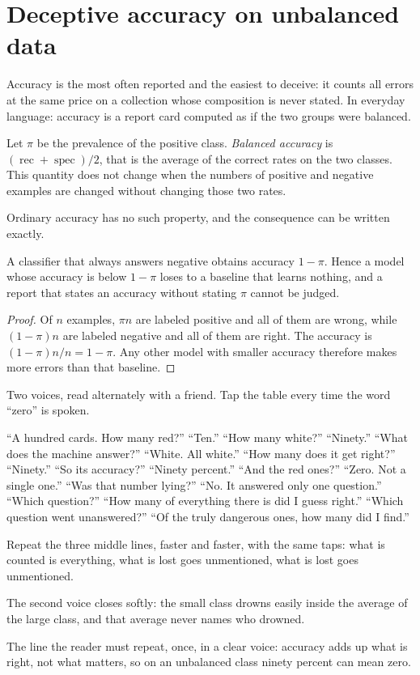 \section{Deceptive accuracy on unbalanced data}

Accuracy is the most often reported and the easiest to deceive: it counts all errors at the same
price on a collection whose composition is never stated. In everyday language: accuracy is a report
card computed as if the two groups were balanced.

\begin{definisi}
Let $\pi$ be the prevalence of the positive class. \emph{Balanced accuracy} is
$(\operatorname{rec}+\operatorname{spec})/2$, that is the average of the correct rates on the two
classes. This quantity does not change when the numbers of positive and negative examples are
changed without changing those two rates.
\end{definisi}

Ordinary accuracy has no such property, and the consequence can be written exactly.

\begin{proposisi}
A classifier that always answers negative obtains accuracy $1-\pi$. Hence a model whose accuracy
is below $1-\pi$ loses to a baseline that learns nothing, and a report that states an accuracy
without stating $\pi$ cannot be judged.
\end{proposisi}

\begin{proof}[Proof]
Of $n$ examples, $\pi n$ are labeled positive and all of them are wrong, while $(1-\pi)n$ are
labeled negative and all of them are right. The accuracy is $(1-\pi)n/n=1-\pi$. Any other model
with smaller accuracy therefore makes more errors than that baseline.
\end{proof}

\begin{bacakeras}
Two voices, read alternately with a friend. Tap the table every time the word ``zero'' is spoken.

``A hundred cards. How many red?'' ``Ten.'' ``How many white?'' ``Ninety.'' ``What does the machine
answer?'' ``White. All white.'' ``How many does it get right?'' ``Ninety.'' ``So its accuracy?''
``Ninety percent.'' ``And the red ones?'' ``Zero. Not a single one.'' ``Was that number lying?''
``No. It answered only one question.'' ``Which question?'' ``How many of everything there is did I
guess right.'' ``Which question went unanswered?'' ``Of the truly dangerous ones, how many did I
find.''

Repeat the three middle lines, faster and faster, with the same taps: what is counted is
everything, what is lost goes unmentioned, what is lost goes unmentioned.

The second voice closes softly: the small class drowns easily inside the average of the large
class, and that average never names who drowned.

The line the reader must repeat, once, in a clear voice: accuracy adds up what is right, not what
matters, so on an unbalanced class ninety percent can mean zero.
\end{bacakeras}

